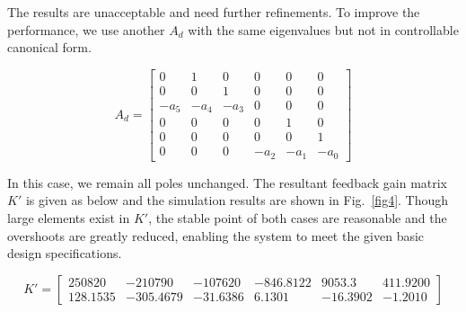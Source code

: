 \documentclass[hyperref]{article}
\theoremstyle{nonumberplain}
\begin{document}
	The results are unacceptable and need further refinements. To improve the performance, we use another $A_{d}$ with the same eigenvalues but not in controllable canonical form.
	
	\begin{equation}
	A_{d}=\begin{bmatrix}
	0 &1  &0  &0  &0  &0 \\ 
	0 &0  &1  &0  &0  &0 \\ 
	-a_{5} &-a_{4}  &-a_{3}  &0  &0  &0 \\ 
	0 &0  &0  &0  &1  &0 \\ 
	0 &0  &0  &0  &0  &1 \\ 
	0 &0  &0  & -a_{2} &-a_{1}  & -a_{0}
	\end{bmatrix}
	\nonumber
	\end{equation}
	
	In this case, we remain all poles unchanged. The resultant feedback gain matrix ${K}'$ is given as below and the simulation results are shown in Fig.~\ref{fig4}. Though large elements exist in ${K}'$, the stable point of both cases are reasonable and the overshoots are greatly reduced, enabling the system to meet the given basic design specifications.
	

	\begin{equation}
	{K}'=\begin{bmatrix}
	250820 &-210790  &-107620  &-846.8122  &9053.3  &411.9200 \\ 
	128.1535 &-305.4679  &-31.6386  &6.1301  &-16.3902  &-1.2010 
	\end{bmatrix}
	\nonumber
	\end{equation}
	
\end{document}
